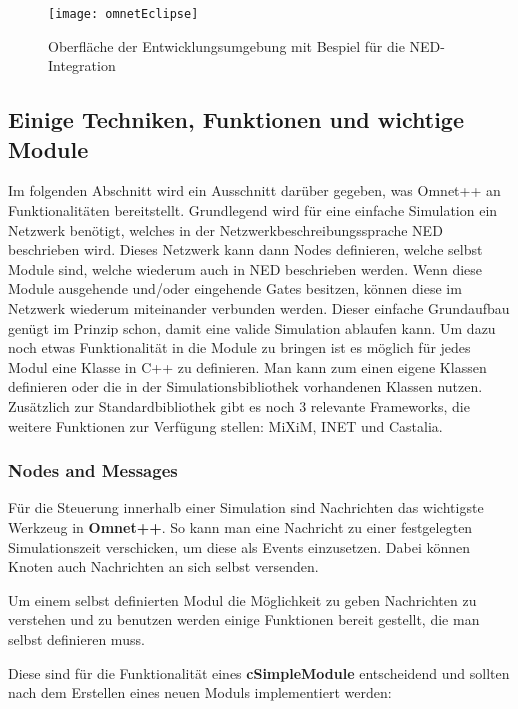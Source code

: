 \begin{figure}[htbp]
\centering
\caption{Oberfläche der Entwicklungsumgebung mit Bespiel für die NED-Integration}
\label{fig:messageEvent}
\texttt{[image: omnetEclipse]}
\end{figure}

\subsection{Einige Techniken, Funktionen und wichtige Module}

Im folgenden Abschnitt wird ein Ausschnitt darüber gegeben, was Omnet++ an Funktionalitäten bereitstellt. Grundlegend wird für eine einfache Simulation ein Netzwerk benötigt, welches in der Netzwerkbeschreibungssprache NED beschrieben wird. Dieses Netzwerk kann dann Nodes definieren, welche selbst Module sind, welche wiederum auch in NED beschrieben werden. Wenn diese Module ausgehende und/oder eingehende Gates besitzen, können diese im Netzwerk wiederum miteinander verbunden werden.\newline
Dieser einfache Grundaufbau genügt im Prinzip schon, damit eine valide Simulation ablaufen kann. Um dazu noch etwas Funktionalität in die Module zu bringen ist es möglich für jedes Modul eine Klasse in C++ zu definieren. Man kann zum einen eigene Klassen definieren oder die in der Simulationsbibliothek vorhandenen Klassen nutzen.\newline
Zusätzlich zur Standardbibliothek gibt es noch 3 relevante Frameworks, die weitere Funktionen zur Verfügung stellen: MiXiM, INET und Castalia.

\subsubsection{Nodes and Messages}\label{para:Nodes and Messages}

Für die Steuerung innerhalb einer Simulation sind Nachrichten das wichtigste Werkzeug in \textbf{Omnet++}. So kann man eine Nachricht zu einer festgelegten Simulationszeit verschicken, um diese als Events einzusetzen. Dabei können Knoten auch Nachrichten an sich selbst versenden.

Um einem selbst definierten Modul die Möglichkeit zu geben Nachrichten zu verstehen und zu benutzen werden einige Funktionen bereit gestellt, die man selbst definieren muss.

Diese sind für die Funktionalität eines \textbf{cSimpleModule} entscheidend und sollten nach dem Erstellen eines neuen Moduls implementiert werden:


